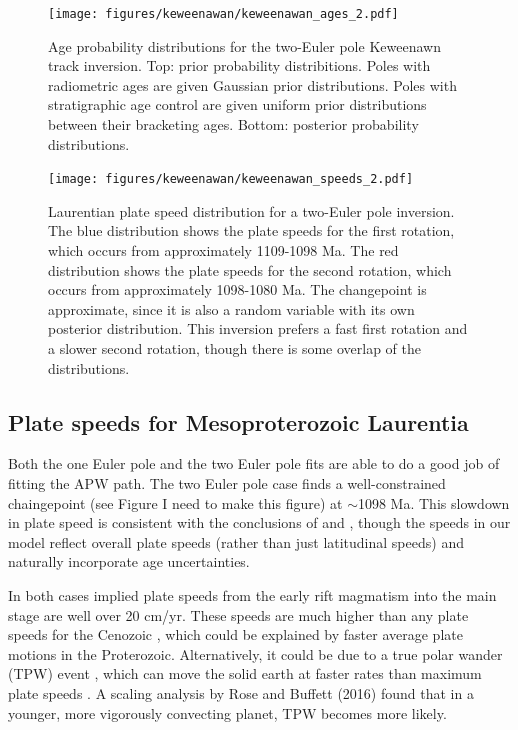 \documentclass[preprint,12pt,authoryear]{elsarticle}
\begin{document}
\begin{figure}
\texttt{[image: figures/keweenawan/keweenawan\_ages\_2.pdf]}
\caption[Age probability distributions for the two-Euler pole Keweenawan track inversion]{Age probability distributions for the two-Euler pole Keweenawn track inversion. Top: prior probability distribitions. Poles with radiometric ages are given Gaussian prior distributions. Poles with stratigraphic age control are given uniform prior distributions between their bracketing ages. Bottom: posterior probability distributions.}
\label{fig:keweenawan_ages_2}
\end{figure}
\begin{figure}
\texttt{[image: figures/keweenawan/keweenawan\_speeds\_2.pdf]}
\caption[Laurentian plate speed distribution for a two-Euler pole inversion]{Laurentian plate speed distribution for a two-Euler pole inversion. The blue distribution shows the plate speeds for the first rotation, which occurs from approximately 1109-1098 Ma. The red distribution shows the plate speeds for the second rotation, which occurs from approximately 1098-1080 Ma. The changepoint is approximate, since it is also a random variable with its own posterior distribution. This inversion prefers a fast first rotation and a slower second rotation, though there is some overlap of the distributions.}
\label{fig:keweenawan_speeds_2}
\end{figure}
\subsection{Plate speeds for Mesoproterozoic Laurentia}

Both the one Euler pole and the two Euler pole fits are able to do a good job of fitting the APW path.
The two Euler pole case finds a well-constrained chaingepoint (see Figure I need to make this figure) at $\sim$1098 Ma.
This slowdown in plate speed is consistent with the conclusions of \citet{davis1997geochronology} 
and \citet{swanson2009no}, though the speeds in our model reflect overall plate speeds 
(rather than just latitudinal speeds) and naturally incorporate age uncertainties.

In both cases implied plate speeds from the early rift magmatism into the main stage are well over 20 cm/yr.
These speeds are much higher than any plate speeds for the Cenozoic \citep{zahirovic2015tectonic},
which could be explained by faster average plate motions in the Proterozoic.
Alternatively, it could be due to a true polar wander (TPW) event \citep{evans2003true, swanson2009no},
which can move the solid earth at faster rates than maximum plate speeds \citep{cambiotti2011new}.
A scaling analysis by Rose and Buffett (2016) found that in a younger, more vigorously convecting
planet, TPW becomes more likely.
\end{document}
